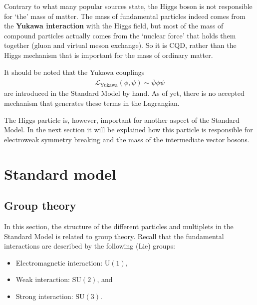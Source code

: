     \begin{remark}
        Contrary to what many popular sources state, the Higgs boson is not responsible for `the' mass of matter. The mass of fundamental particles indeed comes from the \textbf{Yukawa interaction} with the Higgs field, but most of the mass of compound particles actually comes from the `nuclear force' that holds them together (gluon and virtual meson exchange). So it is CQD, rather than the Higgs mechanism that is important for the mass of ordinary matter.

        It should be noted that the Yukawa couplings
        \begin{gather}
            \mathcal{L}_{\text{Yukawa}}(\phi,\psi)\sim\overline{\psi}\phi\psi
        \end{gather}
        are introduced in the Standard Model by hand. As of yet, there is no accepted mechanism that generates these terms in the Lagrangian.

        The Higgs particle is, however, important for another aspect of the Standard Model. In the next section it will be explained how this particle is responsible for electroweak symmetry breaking and the mass of the intermediate vector bosons.
    \end{remark}

\section{Standard model}
\subsection{Group theory}

    In this section, the structure of the different particles and multiplets in the Standard Model is related to group theory. Recall that the fundamental interactions are described by the following (Lie) groups:
    \begin{itemize}
        \item Electromagnetic interaction: $\mathrm{U}(1)$,
        \item Weak interaction: $\mathrm{SU}(2)$, and
        \item Strong interaction: $\mathrm{SU}(3)$.
    \end{itemize}

